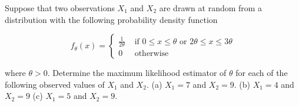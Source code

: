 \begin{example}
	\label{exa:isi2023psb6}
	Suppose that two observations $X_1$ and $X_2$ are drawn at random from a distribution with the following probability density function
	
	$$
	f_\theta(x)= \begin{cases}\frac{1}{2 \theta} & \text { if } 0 \leq x \leq \theta \text { or } 2 \theta \leq x \leq 3 \theta \\ 0 & \text { otherwise }\end{cases}
	$$
	
	where $\theta>0$. Determine the maximum likelihood estimator of $\theta$ for each of the following observed values of $X_1$ and $X_2$.
	(a) $X_1=7$ and $X_2=9$.
	(b) $X_1=4$ and $X_2=9$
	(c) $X_1=5$ and $X_2=9$.
\end{example}



